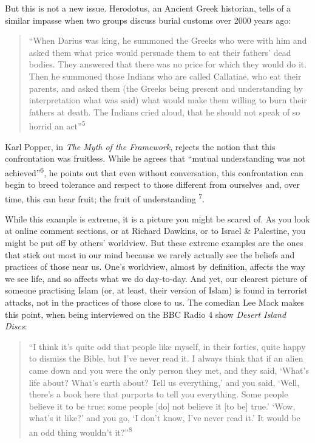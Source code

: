 \documentclass[]{article}
\begin{document}
But this is not a new issue. Herodotus, an Ancient Greek historian,
tells of a similar impasse when two groups discuss burial customs over
2000 years ago:

\begin{quote}
``When Darius was king, he summoned the Greeks who were with him and
asked them what price would persuade them to eat their fathers' dead
bodies. They answered that there was no price for which they would do
it. Then he summoned those Indians who are called Callatiae, who eat
their parents, and asked them (the Greeks being present and
understanding by interpretation what was said) what would make them
willing to burn their fathers at death. The Indians cried aloud, that he
should not speak of so horrid an act''\textsuperscript{5}
\end{quote}

Karl Popper, in \emph{The Myth of the Framework}, rejects the notion
that this confrontation was fruitless. While he agrees that ``mutual
understanding was not achieved''\textsuperscript{6}, he points out that
even without conversation, this confrontation can begin to breed
tolerance and respect to those different from ourselves and, over time,
this can bear fruit; the fruit of understanding \textsuperscript{7}.

While this example is extreme, it is a picture you might be scared of.
As you look at online comment sections, or at Richard Dawkins, or to
Israel \& Palestine, you might be put off by others' worldview. But
these extreme examples are the ones that stick out most in our mind
because we rarely actually see the beliefs and practices of those near
us. One's worldview, almost by definition, affects the way we see life,
and so affects what we do day-to-day. And yet, our clearest picture of
someone practising Islam (or, at least, their version of Islam) is found
in terrorist attacks, not in the practices of those close to us. The
comedian Lee Mack makes this point, when being interviewed on the BBC
Radio 4 show \emph{Desert Island Discs}:

\begin{quote}
``I think it's quite odd that people like myself, in their forties,
quite happy to dismiss the Bible, but I've never read it. I always think
that if an alien came down and you were the only person they met, and
they said, `What's life about? What's earth about? Tell us everything,'
and you said, `Well, there's a book here that purports to tell you
everything. Some people believe it to be true; some people {[}do{]} not
believe it {[}to be{]} true.' `Wow, what's it like?' and you go, `I
don't know, I've never read it.' It would be an odd thing wouldn't
it?''\textsuperscript{8}
\end{quote}
\end{document}
